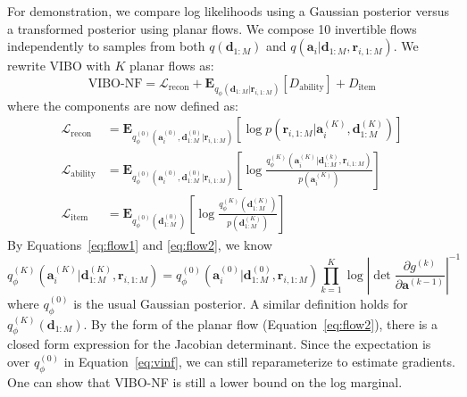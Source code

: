 For demonstration, we compare log likelihoods using a Gaussian posterior versus a transformed posterior using planar flows.
We compose 10 invertible flows independently to samples from both $q(\mathbf{d}_{1:M})$ and $q(\mathbf{a}_i|\mathbf{d}_{1:M},\mathbf{r}_{i,1:M})$.
We rewrite VIBO with $K$ planar flows as:
\begin{equation}
\text{VIBO-NF} = \mathcal{L}_{\text{recon}} + \mathbf{E}_{q_\phi(\mathbf{d}_{1:M}|\mathbf{r}_{i,1:M})}[D_{\text{ability}}] + D_{\text{item}}
\label{eq:vinf}
\end{equation}
where the components are now defined as:
\begin{align*}
    \mathcal{L}_{\text{recon}} &= \mathbf{E}_{q^{(0)}_\phi(\mathbf{a}^{(0)}_i, \mathbf{d}^{(0)}_{1:M}|\mathbf{r}_{i,1:M})}\left[ \log p(\mathbf{r}_{i,1:M}|\mathbf{a}^{(K)}_i, \mathbf{d}^{(K)}_{1:M}) \right] \\
    \mathcal{L}_{\text{ability}} &= \mathbf{E}_{q^{(0)}_\phi(\mathbf{a}^{(0)}_i, \mathbf{d}^{(0)}_{1:M}|\mathbf{r}_{i,1:M})}\left[ \log \frac{q^{(K)}_\phi(\mathbf{a}^{(K)}_i|\mathbf{d}^{(k)}_{1:M},\mathbf{r}_{i,1:M})}{p(\mathbf{a}^{(K)}_i)} \right] \\
    \mathcal{L}_{\text{item}} &= \mathbf{E}_{q^{(0)}_\phi(\mathbf{d}^{(0)}_{1:M})}\left[ \log \frac{q^{(K)}_\phi(\mathbf{d}^{(K)}_{1:M})}{p(\mathbf{d}^{(K)}_{1:M})} \right]
\end{align*}
By Equations~\ref{eq:flow1} and \ref{eq:flow2}, we know
\begin{equation*}
    q^{(K)}_\phi(\mathbf{a}^{(K)}_i|\mathbf{d}^{(K)}_{1:M},\mathbf{r}_{i,1:M}) = q^{(0)}_\phi(\mathbf{a}^{(0)}_i|\mathbf{d}^{(0)}_{1:M},\mathbf{r}_{i,1:M})\prod_{k=1}^K \log \left| \det \frac{\partial g^{(k)}}{\partial \mathbf{a}^{(k-1)}} \right|^{-1}
\end{equation*}
where $q^{(0)}_\phi$ is the usual Gaussian posterior.
A similar definition holds for $q^{(K)}_{\phi}(\mathbf{d}_{1:M})$.
By the form of the planar flow (Equation~\ref{eq:flow2}), there is a closed form expression for the Jacobian determinant.
Since the expectation is over $q^{(0)}_\phi$ in Equation~\ref{eq:vinf}, we can still reparameterize to estimate gradients.
One can show that VIBO-NF is still a lower bound on the log marginal.